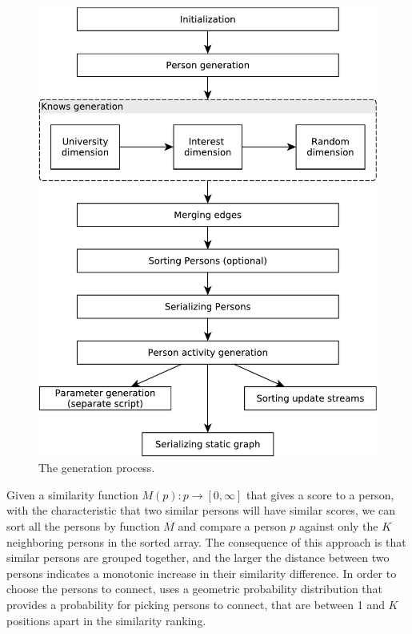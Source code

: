 \begin{figure}[H]
    \centering
    \includegraphics[scale=\patternscale]{figures/datagen-workflow}
    \caption{The \datagen generation process.}
    \label{figure:generation_process}
\end{figure}

Given a similarity function $M(p) : p \rightarrow [0, \infty]$ that gives a score to a person,
with the characteristic that two similar persons will have similar scores, we
can sort all the persons by function $M$ and compare a person $p$ against only the
$K$ neighboring persons in the sorted array. The consequence of this approach is
that similar persons are grouped together, and the larger the
distance between two persons indicates a monotonic increase in their similarity
difference. In order to choose the persons to connect, \datagen uses a geometric
probability distribution that provides a probability for picking persons to
connect, that are between 1 and $K$ positions apart in the similarity
ranking.

